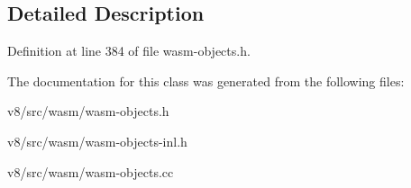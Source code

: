 \subsection{Detailed Description}


Definition at line 384 of file wasm-\/objects.\+h.



The documentation for this class was generated from the following files\+:\begin{DoxyCompactItemize}
\item 
v8/src/wasm/wasm-\/objects.\+h\item 
v8/src/wasm/wasm-\/objects-\/inl.\+h\item 
v8/src/wasm/wasm-\/objects.\+cc\end{DoxyCompactItemize}
